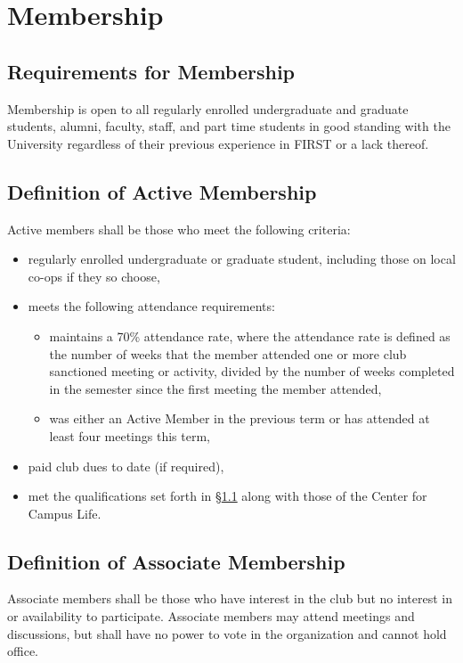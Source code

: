 \documentclass[english,11pt]{article}
\begin{document}
\section{Membership} \label{art:membership}
\subsection{Requirements for Membership} \label{sect:membership:requirements}
Membership is open to all regularly enrolled undergraduate and graduate students, alumni, faculty, staff, and part time students in good standing with the University regardless of their previous experience in FIRST or a lack thereof.

\subsection{Definition of Active Membership} \label{sect:membership:active}
Active members shall be those who meet the following criteria:
\begin{itemize}
    \item regularly enrolled undergraduate or graduate student, including those on local co-ops if they so choose,
    \item meets the following attendance requirements:
    \begin{itemize}
        \item maintains a 70\% attendance rate, where the attendance rate is defined as the number of weeks that the member attended one or more club sanctioned meeting or activity, divided by the number of weeks completed in the semester since the first meeting the member attended,
        \item was either an Active Member in the previous term or has attended at least four meetings this term,
    \end{itemize}
    \item paid club dues to date (if required),
    \item met the qualifications set forth in §\ref{sect:membership:requirements} along with those of the Center for Campus Life.
\end{itemize}

\subsection{Definition of Associate Membership} \label{sect:membership:associate}
Associate members shall be those who have interest in the club but no interest in or availability to participate.
Associate members may attend meetings and discussions, but shall have no power to vote in the organization and cannot hold office.
\end{document}
